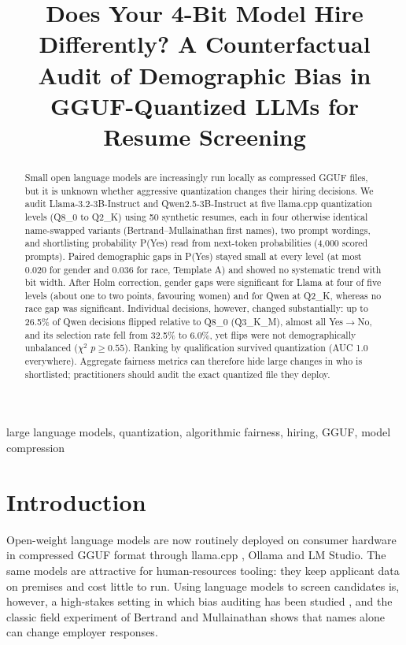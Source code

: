 \documentclass[conference]{IEEEtran}
\begin{document}
\title{Does Your 4-Bit Model Hire Differently? A Counterfactual Audit of Demographic Bias in GGUF-Quantized LLMs for Resume Screening}

\author{
}

\maketitle

\begin{abstract}
Small open language models are increasingly run locally as compressed GGUF files, but it is unknown whether aggressive quantization changes their hiring decisions. We audit Llama-3.2-3B-Instruct and Qwen2.5-3B-Instruct at five llama.cpp quantization levels (Q8\_0 to Q2\_K) using 50 synthetic resumes, each in four otherwise identical name-swapped variants (Bertrand--Mullainathan first names), two prompt wordings, and shortlisting probability P(Yes) read from next-token probabilities (4,000 scored prompts). Paired demographic gaps in P(Yes) stayed small at every level (at most 0.020 for gender and 0.036 for race, Template A) and showed no systematic trend with bit width. After Holm correction, gender gaps were significant for Llama at four of five levels (about one to two points, favouring women) and for Qwen at Q2\_K, whereas no race gap was significant. Individual decisions, however, changed substantially: up to 26.5\% of Qwen decisions flipped relative to Q8\_0 (Q3\_K\_M), almost all Yes$\to$No, and its selection rate fell from 32.5\% to 6.0\%, yet flips were not demographically unbalanced ($\chi^2$ $p\ge0.55$). Ranking by qualification survived quantization (AUC 1.0 everywhere). Aggregate fairness metrics can therefore hide large changes in who is shortlisted; practitioners should audit the exact quantized file they deploy.
\end{abstract}

\begin{IEEEkeywords}
large language models, quantization, algorithmic fairness, hiring, GGUF, model compression
\end{IEEEkeywords}

\section{Introduction}
Open-weight language models are now routinely deployed on consumer hardware in compressed GGUF format through llama.cpp \cite{gerganov}, Ollama and LM Studio. The same models are attractive for human-resources tooling: they keep applicant data on premises and cost little to run. Using language models to screen candidates is, however, a high-stakes setting in which bias auditing has been studied \cite{koh2023}, and the classic field experiment of Bertrand and Mullainathan \cite{bertrand2004} shows that names alone can change employer responses.
\end{document}
